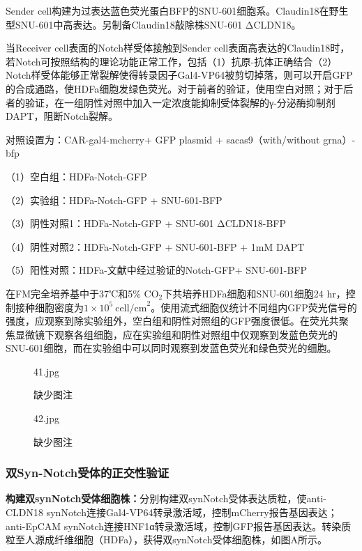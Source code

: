 \documentclass[12pt]{article}
\begin{document}
Sender cell构建为过表达蓝色荧光蛋白BFP的SNU-601细胞系。Claudin18在野生型SNU-601中高表达。另制备Claudin18敲除株SNU-601 ΔCLDN18。

当Receiver cell表面的Notch样受体接触到Sender cell表面高表达的Claudin18时，若Notch可按照结构的理论功能正常工作，包括（1）抗原-抗体正确结合（2）Notch样受体能够正常裂解使得转录因子Gal4-VP64被剪切掉落，则可以开启GFP的合成通路，使HDFa细胞发绿色荧光。对于前者的验证，使用空白对照；对于后者的验证，在一组阴性对照中加入一定浓度能抑制受体裂解的γ-分泌酶抑制剂DAPT，阻断Notch裂解。

对照设置为：CAR-gal4-mcherry+ GFP plasmid + sacas9（with/without grna）-bfp

（1）空白组：HDFa-Notch-GFP

（2）实验组：HDFa-Notch-GFP + SNU-601-BFP

（3）阴性对照1：HDFa-Notch-GFP + SNU-601 ΔCLDN18-BFP

（4）阴性对照2：HDFa-Notch-GFP + SNU-601-BFP + 1mM DAPT

（5）阳性对照：HDFa-文献中经过验证的Notch-GFP+ SNU-601-BFP


在FM完全培养基中于37℃和5\% $\mathrm{CO}_2$下共培养HDFa细胞和SNU-601细胞24 hr，控制接种细胞密度为$1\times 10^5 \ \mathrm{cell / cm}^2$。使用流式细胞仪统计不同组内GFP荧光信号的强度，应观察到除实验组外，空白组和阴性对照组的GFP强度很低。在荧光共聚焦显微镜下观察各组细胞，应在实验组和阴性对照组中仅观察到发蓝色荧光的SNU-601细胞，而在实验组中可以同时观察到发蓝色荧光和绿色荧光的细胞。

\begin{figure}[h]
	\centering
	\begin{overpic}[width=0.8\columnwidth]{41.jpg}
	\end{overpic}
	\caption{缺少图注}
	\label{organ}
\end{figure}

\begin{figure}[h]
	\centering
	\begin{overpic}[width=0.6\columnwidth]{42.jpg}
	\end{overpic}
	\caption{缺少图注}
	\label{organ}
\end{figure}

\subsubsection{双Syn-Notch受体的正交性验证}

\textbf{构建双synNotch受体细胞株：}分别构建双synNotch受体表达质粒，使anti-CLDN18 synNotch连接Gal4-VP64转录激活域，控制mCherry报告基因表达；anti-EpCAM synNotch连接HNF1α转录激活域，控制GFP报告基因表达。转染质粒至人源成纤维细胞（HDFa），获得双synNotch受体细胞株，如图\label{5}A所示。
\end{document}
